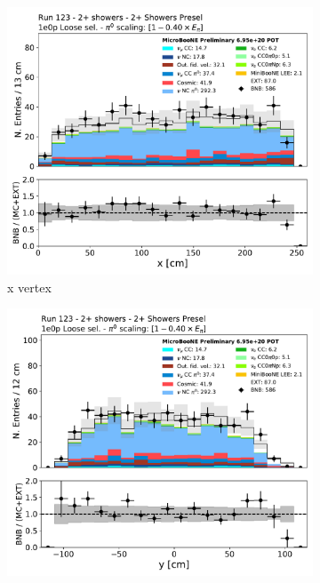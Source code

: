 \begin{figure}[H]
    \centering
    \begin{subfigure}{0.3\textwidth}
    \includegraphics[width=1.0\textwidth]{Sidebands/Figures/TwoShr_1e0pSel/loose/reco_nu_vtx_x.pdf}
    \caption{x vertex}
    \end{subfigure}
    \begin{subfigure}{0.3\textwidth}
    \includegraphics[width=1.0\textwidth]{Sidebands/Figures/TwoShr_1e0pSel/loose/reco_nu_vtx_y.pdf}

\end{subfigure}
\end{figure}
